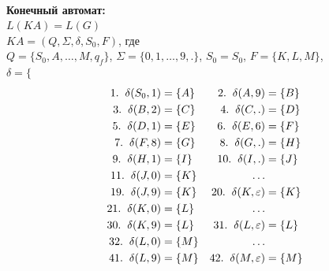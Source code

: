 \documentclass[a4paper,10pt]{article}
\begin{document}
	\newpage
	
	\text{} \\
	\textbf{Конечный автомат:} \\[3mm]
	\hspace*{5mm} $L(KA) = L(G)$ \\[2mm]
	\hspace*{5mm} $KA = (Q, \varSigma, \delta, S_0, F)$, где \\[2mm]
	\hspace*{5mm} $Q = \{ S_0, A, \dots, M, q_f \}$, $\varSigma = \{ 0, 1, \dots, 9, . \}$, $S_0=S_0$, $F=\{ K, L, M \}$, \\[2mm]
	\hspace*{5mm} $\delta = \{ $
	\begin{align*}
		1. \hspace{2mm} \delta(S_0, 1) &= \{A\} & 2. \hspace{2mm} \delta(A, 9) &= \{B\}  \\ 
		3. \hspace{2mm} \delta(B, 2) &= \{C\} & 4. \hspace{2mm} \delta(C, .) &= \{D\}  \\
		5. \hspace{2mm} \delta(D, 1) &= \{E\} & 6. \hspace{2mm} \delta(E, 6) &= \{F\}  \\
		7. \hspace{2mm} \delta(F, 8) &= \{G\} & 8. \hspace{2mm} \delta(G, .) &= \{H\}  \\
		9. \hspace{2mm} \delta(H, 1) &= \{I\} & 10. \hspace{2mm} \delta(I, .) &= \{J\}  \\
		11. \hspace{2mm} \delta(J, 0) &= \{K\} & \dots  \\
		19. \hspace{2mm} \delta(J, 9) &= \{K\} & 20. \hspace{2mm} \delta(K, \varepsilon) &= \{K\} \\
		21. \hspace{2mm} \delta(K, 0) &= \{L\} & \dots \\
		30. \hspace{2mm} \delta(K, 9) &= \{L\} & 31. \hspace{2mm} \delta(L, \varepsilon) &= \{L\} \\
		32. \hspace{2mm} \delta(L, 0) &= \{M\} & \dots \\
		41. \hspace{2mm} \delta(L, 9) &= \{M\} & 42. \hspace{2mm} \delta(M, \varepsilon) &= \{M\}
	\end{align*}
\end{document}
